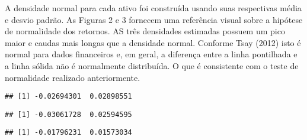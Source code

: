 \documentclass[]{article}
\newenvironment{Shaded}{\begin{snugshade}}{\end{snugshade}}
\newcommand{\KeywordTok}[1]{\textcolor[rgb]{0.13,0.29,0.53}{\textbf{{#1}}}}
\newcommand{\DataTypeTok}[1]{\textcolor[rgb]{0.13,0.29,0.53}{{#1}}}
\newcommand{\DecValTok}[1]{\textcolor[rgb]{0.00,0.00,0.81}{{#1}}}
\newcommand{\StringTok}[1]{\textcolor[rgb]{0.31,0.60,0.02}{{#1}}}
\newcommand{\CommentTok}[1]{\textcolor[rgb]{0.56,0.35,0.01}{\textit{{#1}}}}
\newcommand{\NormalTok}[1]{{#1}}
\begin{document}
A densidade normal para cada ativo foi construída usando suas
respectivas média e desvio padrão. As Figuras 2 e 3 fornecem uma
referência visual sobre a hipótese de normalidade dos retornos. AS três
densidades estimadas possuem um pico maior e caudas mais longas que a
densidade normal. Conforme Tsay (2012) isto é normal para dados
financeiros e, em geral, a diferença entre a linha pontilhada e a linha
sólida não é normalmente distribuída. O que é consistente com o teste de
normalidade realizado anteriormente.

\begin{Shaded}
\end{Shaded}

\begin{verbatim}
## [1] -0.02694301  0.02898551
\end{verbatim}

\begin{Shaded}
\end{Shaded}

\begin{verbatim}
## [1] -0.03061728  0.02594595
\end{verbatim}

\begin{Shaded}
\end{Shaded}

\begin{verbatim}
## [1] -0.01796231  0.01573034
\end{verbatim}
\end{document}
